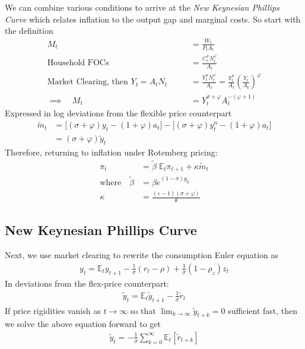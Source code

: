 \documentclass[12pt]{article}
\theoremstyle{plain}
\theoremstyle{definition}
\theoremstyle{remark}
\newcommand{\ra}{\rightarrow}
\newcommand{\E}{\mathbb{E}}
\begin{document}
We can combine various conditions to arrive at the
\emph{New Keynesian Phillips Curve} which relates inflation to the
output gap and marginal costs. So start with the definition
\begin{align*}
  M_t
  &= \frac{W_t}{P_tA_t} \\
  \text{Household FOCs}\qquad
  &= \frac{C_t^\sigma N_t^\varphi}{A_t}
  \\
  \text{Market Clearing, then $Y_t=A_tN_t$}\qquad
  &= \frac{Y_t^\sigma N_t^\varphi}{A_t}
  =
  \frac{Y_t^\sigma}{A_t}
  \left(
  \frac{Y_t}{A_t}
  \right)^\varphi \\
  \implies\quad
  M_t &= Y_t^{\sigma+\varphi}A_t^{-(\varphi+1)}
\end{align*}
Expressed in log deviations from the flexible price counterpart
\begin{align*}
  \tilde{m}_t
  &=
  \big[(\sigma+\varphi)y_t-(1+\varphi)a_t\big]
  -
  \big[(\sigma+\varphi)y^n_t-(1+\varphi)a_t\big]
  \\
  &=
  \left(\sigma+\varphi\right)
  \tilde{y}_t
\end{align*}
Therefore, returning to inflation under Rotemberg pricing:
\begin{align*}
  \pi_t &= \tilde{\beta}\;\E_t\pi_{t+1} + \kappa \tilde{m}_t \\
  \text{where}\quad
  \tilde{\beta} &=
    \beta e^{(1-\sigma)g_y} \\
  \kappa &=
    \frac{(\varepsilon-1)(\sigma+\varphi)}{\theta}
\end{align*}


\subsection{New Keynesian Phillips Curve}

Next, we use market clearing to rewrite the consumption Euler equation
as
\begin{align*}
  y_t = \E_ty_{t+1}
  - \frac{1}{\sigma}(r_t-\rho)
  + \frac{1}{\sigma}(1-\rho_z)z_t
\end{align*}
In deviations from the flex-price counterpart:
\begin{align*}
  \tilde{y}_t
  = \E_t\tilde{y}_{t+1}
  - \frac{1}{\sigma}\tilde{r}_t
\end{align*}
If price rigidities vanish as $t\ra\infty$ so that
$\lim_{k\ra\infty}\tilde{y}_{t+k}=0$ sufficient fast, then we solve
the above equation forward to get
\begin{align*}
  \tilde{y}_t
  =
  - \frac{1}{\sigma}
  \sum_{k=0}^\infty \E_t[\tilde{r}_{t+k}]
\end{align*}
\end{document}
